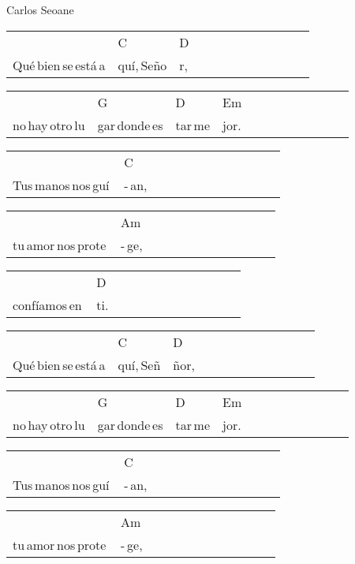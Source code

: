 Carlos Seoane\hfill
\begin{multicols}{2}
\noindent
\begin{minipage}{\columnwidth}
\noindent
\noindent
\begin{tabular}{llllllllllll}
&C&D\\
Qué\,bien\,se\,está\,a&quí,\,Seño&r,
\end{tabular}

\noindent
\begin{tabular}{llllllllllll}
&G&D&Em\\
no\,hay\,otro\,lu&gar\,donde\,es&tar\,me&jor.
\end{tabular}

\noindent
\begin{tabular}{llllllllllll}
&C\\
Tus\,manos\,nos\,guí\,&-\,an,
\end{tabular}

\noindent
\begin{tabular}{llllllllllll}
&Am\\
tu\,amor\,nos\,prote\,&-\,ge,
\end{tabular}

\noindent
\begin{tabular}{llllllllllll}
&D\\
confíamos\,en\,&ti.
\end{tabular}

\noindent
\begin{tabular}{llllllllllll}
&C&D\\
Qué\,bien\,se\,está\,a&quí,\,Señ&ñor,
\end{tabular}

\noindent
\begin{tabular}{llllllllllll}
&G&D&Em\\
no\,hay\,otro\,lu&gar\,donde\,es&tar\,me&jor.
\end{tabular}

\noindent
\begin{tabular}{llllllllllll}
&C\\
Tus\,manos\,nos\,guí\,&-\,an,
\end{tabular}

\noindent
\begin{tabular}{llllllllllll}
&Am\\
tu\,amor\,nos\,prote\,&-\,ge,
\end{tabular}


\end{minipage}
\end{multicols}
